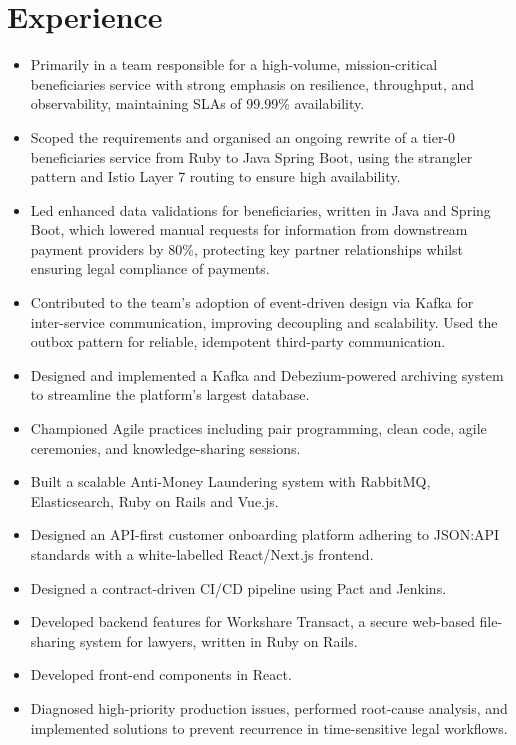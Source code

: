 \documentclass[11pt,letterpaper]{article}
\begin{document}
\cvheader

\section*{Experience}
\begin{itemize}
  \item Primarily in a team responsible for a high-volume, mission-critical beneficiaries service with strong emphasis on resilience, throughput, and observability, maintaining SLAs of 99.99\% availability.
  \item Scoped the requirements and organised an ongoing rewrite of a tier-0 beneficiaries service from Ruby to Java Spring Boot, using the strangler pattern and Istio Layer 7 routing to ensure high availability.
  \item Led enhanced data validations for beneficiaries, written in Java and Spring Boot, which lowered manual requests for information from downstream payment providers by 80\%, protecting key partner relationships whilst ensuring legal compliance of payments.
  \item Contributed to the team's adoption of event-driven design via Kafka for inter-service communication, improving decoupling and scalability. Used the outbox pattern for reliable, idempotent third-party communication.
  \item Designed and implemented a Kafka and Debezium-powered archiving system to streamline the platform's largest database.
  \item Championed Agile practices including pair programming, clean code, agile ceremonies, and knowledge-sharing sessions.
\end{itemize}
\begin{itemize}
  \item Built a scalable Anti-Money Laundering system with RabbitMQ, Elasticsearch, Ruby on Rails and Vue.js.
  \item Designed an API-first customer onboarding platform adhering to JSON:API standards with a white-labelled React/Next.js frontend.
  \item Designed a contract-driven CI/CD pipeline using Pact and Jenkins.
\end{itemize}

\begin{itemize}
  \item Developed backend features for Workshare Transact, a secure web-based file-sharing system for lawyers, written in Ruby on Rails.
  \item Developed front-end components in React.
  \item Diagnosed high-priority production issues, performed root-cause analysis, and implemented solutions to prevent recurrence in time-sensitive legal workflows.
\end{itemize}
\end{document}
